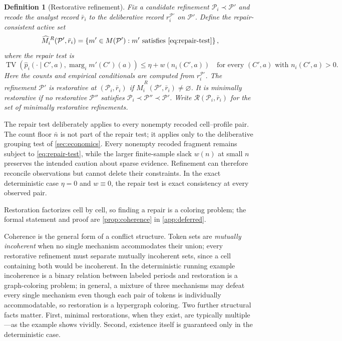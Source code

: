 \documentclass[11pt]{article}
\newtheorem{definition}[assumption]{Definition}
\theoremstyle{definition}
\newcommand{\emptysetset}{\varnothing}
\newcommand{\TV}{\operatorname{TV}}
\newcommand{\marg}[1]{\operatorname{marg}_{#1}}
\begin{document}
\begin{definition}[Restorative refinement]
\label{def:restorative}
Fix a candidate refinement $\mathcal P_i\prec\mathcal P'$ and recode the analyst record $\bar r_i$ to the deliberative record $r_i^{\mathcal P'}$ on $\mathcal P'$.
Define the \emph{repair-consistent active set}
\[
\widehat M_i^{\,R}(\mathcal P',\bar r_i)
=
\left\{
m'\in M(\mathcal P'):
m'\text{ satisfies \cref{eq:repair-test}}
\right\},
\]
where the \emph{repair test} is
\begin{equation}
\TV\!\left(
\hat p_i(\cdot\mid C',a),
\marg{i}m'(C')(a)
\right)
\leq
\eta+w\!\left(n_i(C',a)\right)
\quad
\text{for every $(C',a)$ with }n_i(C',a)>0.
\label{eq:repair-test}
\end{equation}
Here the counts and empirical conditionals are computed from $r_i^{\mathcal P'}$.
The refinement $\mathcal P'$ is \emph{restorative} at $(\mathcal P_i,\bar r_i)$ if $\widehat M_i^{\,R}(\mathcal P',\bar r_i)\neq\emptysetset$.
It is \emph{minimally restorative} if no restorative $\mathcal P''$ satisfies $\mathcal P_i\prec\mathcal P''\prec\mathcal P'$.
Write $\mathcal R(\mathcal P_i,\bar r_i)$ for the set of minimally restorative refinements.
\end{definition}

The repair test deliberately applies to every nonempty recoded cell--profile pair.
The count floor $\bar n$ is not part of the repair test; it applies only to the deliberative grouping test of \cref{sec:economics}.
Every nonempty recoded fragment remains subject to \cref{eq:repair-test}, while the larger finite-sample slack $w(n)$ at small $n$ preserves the intended caution about sparse evidence.
Refinement can therefore reconcile observations but cannot delete their constraints.
In the exact deterministic case $\eta=0$ and $w\equiv0$, the repair test is exact consistency at every observed pair.

Restoration factorizes cell by cell, so finding a repair is a coloring problem; the formal statement and proof are \cref{prop:coherence} in \cref{app:deferred}.

Coherence is the general form of a conflict structure.
Token sets are \emph{mutually incoherent} when no single mechanism accommodates their union; every restorative refinement must separate mutually incoherent sets, since a cell containing both would be incoherent.
In the deterministic running example incoherence is a binary relation between labeled periods and restoration is a graph-coloring problem; in general, a mixture of three mechanisms may defeat every single mechanism even though each pair of tokens is individually accommodatable, so restoration is a hypergraph coloring.
Two further structural facts matter.
First, minimal restorations, when they exist, are typically multiple---as the example shows vividly.
Second, existence itself is guaranteed only in the deterministic case.
\end{document}

